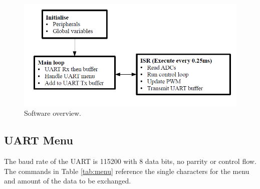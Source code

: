 \documentclass[12pt]{article}%
\begin{document}
\begin{figure}[H]
	\centering
  	\includegraphics[width=12cm]{code.png}
  	\caption{Software overview.}
  	\label{fig:overview}
\end{figure}



\subsection{UART Menu}

The baud rate of the UART is 115200 with 8 data bits, no parrity or control flow. The commands in Table \ref{tab:menu} reference the single characters for the menu and amount of the data to be exchanged.
\end{document}
